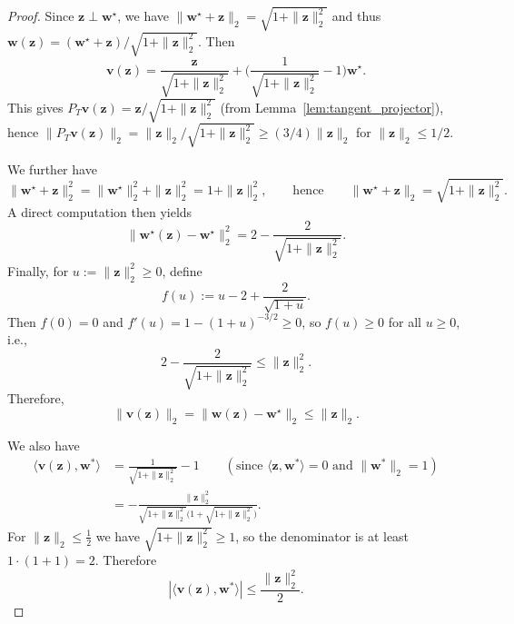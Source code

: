 \documentclass{article}
\theoremstyle{plain}
\theoremstyle{definition}
\theoremstyle{remark}
\begin{document}
{\begin{proof}
Since $\mathbf z\perp \mathbf w^\star$, we have $\|\mathbf w^\star+\mathbf z\|_2=\sqrt{1+\|\mathbf z\|_2^2}$ and thus
$\mathbf w(\mathbf z)=(\mathbf w^\star+\mathbf z)/\sqrt{1+\|\mathbf z\|_2^2}$.
Then
\[
\mathbf v(\mathbf z)=\frac{\mathbf z}{\sqrt{1+\|\mathbf z\|_2^2}}
+\Big(\frac{1}{\sqrt{1+\|\mathbf z\|_2^2}}-1\Big)\mathbf w^\star.
\]
This gives $P_T\mathbf v(\mathbf z)=\mathbf z/\sqrt{1+\|\mathbf z\|_2^2}$ (from Lemma~\ref{lem:tangent_projector}), hence
$\|P_T\mathbf v(\mathbf z)\|_2=\|\mathbf z\|_2/\sqrt{1+\|\mathbf z\|_2^2}\ge (3/4)\|\mathbf z\|_2$ for
$\|\mathbf z\|_2\le 1/2$. 

 We further have
\[
\|\mathbf{w}^\star+\mathbf{z}\|_2^2=\|\mathbf{w}^\star\|_2^2+\|\mathbf{z}\|_2^2=1+\|\mathbf{z}\|_2^2,
\qquad\text{hence}\qquad
\|\mathbf{w}^\star+\mathbf{z}\|_2=\sqrt{1+\|\mathbf{z}\|_2^2}.
\]
A direct computation then yields
\[
\|\mathbf{w}^\star(\mathbf{z})-\mathbf{w}^\star\|_2^2
=
2-\frac{2}{\sqrt{1+\|\mathbf{z}\|_2^2}}.
\]
Finally, for $u:=\|\mathbf{z}\|_2^2\ge 0$, define
\[
f(u):=u-2+\frac{2}{\sqrt{1+u}}.
\]
Then $f(0)=0$ and $f'(u)=1-(1+u)^{-3/2}\ge 0$, so $f(u)\ge 0$ for all $u\ge 0$, i.e.,
\[
2-\frac{2}{\sqrt{1+\|\mathbf{z}\|_2^2}} \le \|\mathbf{z}\|_2^2.
\]
Therefore,
\[
\|\mathbf{v}(\mathbf{z})\|_2=\|\mathbf{w}(\mathbf{z})-\mathbf{w}^\star\|_2 \le \|\mathbf{z}\|_2.
\]


We also have 
\begin{align*}
\langle\mathbf{v}(\mathbf{z}),\mathbf{w}^{*}\rangle
&=\frac{1}{\sqrt{1+\|\mathbf{z}\|_{2}^{2}}}-1\qquad(\text{since }\langle\mathbf{z},\mathbf{w}^{*}\rangle=0\text{ and }\|\mathbf{w}^{*}\|_{2}=1)\\[2mm]
&=-\frac{\|\mathbf{z}\|_{2}^{2}}{\sqrt{1+\|\mathbf{z}\|_{2}^{2}}\bigl(1+\sqrt{1+\|\mathbf{z}\|_{2}^{2}}\bigr)}.
\end{align*}
For $\|\mathbf{z}\|_{2}\le\frac12$ we have $\sqrt{1+\|\mathbf{z}\|_{2}^{2}}\ge 1$, so the denominator is at least $1\cdot(1+1)=2$.  Therefore
\[
|\langle \mathbf{v}(\mathbf{z}),\mathbf{w}^{*}\rangle|
\le\frac{\|\mathbf{z}\|_{2}^{2}}{2}.
\]
\end{proof}

}
\end{document}
